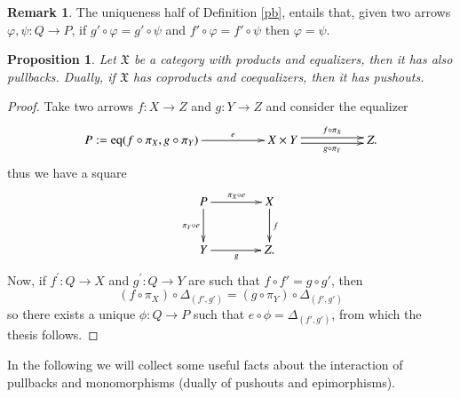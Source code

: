 \documentclass[12pt]{article}
\newtheorem{proposition}[lemma]{Proposition}
\theoremstyle{definition}
\newtheorem{remark}[lemma]{Remark}
\def\X{\mathfrak X}
\DeclareMathOperator{\eq}{eq}
\numberwithin{equation}{section}
\begin{document}
\begin{remark}\label{eq_pb}\reversemarginpar {} \normalmarginpar
The uniqueness half of Definition \ref{pb}, entails that, given two arrows $\varphi, \psi:Q\rightarrow P$, if $g'\circ \varphi = g'\circ \psi$ and $f'\circ \varphi=f'\circ \psi$ then $\varphi = \psi$. 
\end{remark}

\begin{proposition}\label{pb_eq}
	Let $\X$ be a category with products and equalizers, then it has also pullbacks. Dually, if $\X$ has coproducts and coequalizers, then it has pushouts. 
\end{proposition}
\begin{proof}Take two arrows $f:X\rightarrow Z$ and $g:Y\rightarrow Z$ and consider the equalizer
	\[
	\xymatrix@C=50pt{
		P:=\eq(f\circ \pi_X,g\circ \pi_Y)\ar[r]^-e&X\times Y\ar@<-.5ex>[r]_-{g\circ\pi_Y} \ar@<.5ex>[r]^-{f\circ \pi_X}&Z.
	}
	\]
thus we have a square
\[
\xymatrix@R=10pt@C=40pt{
	P\ar@{}[ddr]\ar[dd]_{\pi_Y\circ e}\ar[r]^{\pi_X\circ e}&X\ar[dd]^f\\
	\\
	Y\ar[r]_g&Z.
}\]
Now, if $f^{'}:Q\rightarrow X$ and $g^{'}:Q\rightarrow Y $ are such that $f\circ f'=g\circ g'$, then 
\[
(f\circ \pi_X)\circ \Delta_{(f', g')}=(g\circ \pi_Y)\circ \Delta_{(f', g')}
\]
so there exists a unique $\phi:Q\rightarrow P$ such that $e\circ \phi = \Delta_{(f', g')}$, from which the thesis follows. 
\end{proof}
\iffalse 
Consider the pullback square in \eqref{pullback_eq}. An alternative way to characterize the pullback $P$ of the morphisms $f$ and $g$ is through products and equalizers:
\[
\xymatrix@C=50pt{
P:=\eq(f\circ \pi_X,g\circ \pi_Y)\ar[r]^-e&X\times Y\ar@<-.5ex>[r]_-{g\circ\pi_Y} \ar@<.5ex>[r]^-{f\circ \pi_X}&Z.
}
\]
In this construction, the morphism $f'\colon P\to Y$ and $g'\colon P\to X$ are recovered by the formulas $f':=\pi_Y\circ e$ and $g':=\pi_X\circ e$. Hence, if $\X$ has products and equalizers, then it has also pullbacks and, dually, if $\X$ has coproducts and coequalizers, then it has pushouts. 
\fi 
 In the following we will collect some useful facts about the interaction of pullbacks and monomorphisms (dually of pushouts and epimorphisms).
\end{document}
